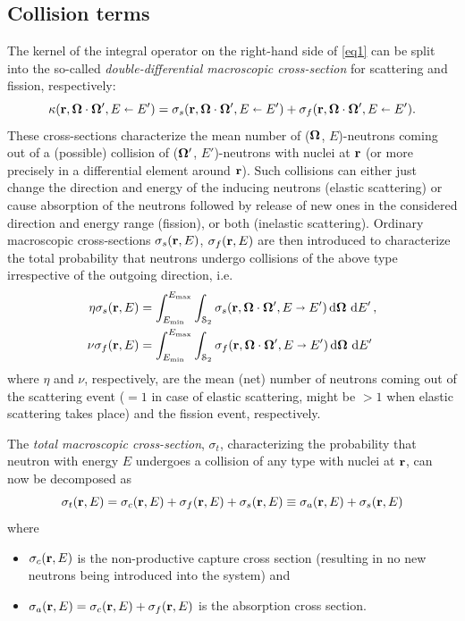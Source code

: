 \subsection{Collision terms}
The kernel of the integral operator on the right-hand side of \eqref{eq1} can be split into the so-called
\textit{double-differential macroscopic cross-section} for scattering and fission, respectively:
\begin{equation}\label{eq:splitting}
  \kappa(\br,\bomega\cdot\bomega',E\sla E') = \sigma_s(\br,\bomega\cdot\bomega',E\sla E') +
  \sigma_f(\br,\bomega\cdot\bomega',E\sla E').
\end{equation}
These cross-sections characterize the mean number of ($\bomega$, $E$)-neutrons coming out of a (possible) collision of 
($\bomega'$, $E'$)-neutrons with nuclei at $\br$ (or more precisely in a
differential element around $\br$). Such collisions can either just change the direction and energy of the
inducing neutrons (elastic scattering) or cause absorption of the neutrons followed by release of
new ones in the considered direction and energy range (fission), or both (inelastic scattering).
Ordinary macroscopic cross-sections $\sigma_s(\br,E)$, $\sigma_f(\br,E)$ are then introduced to characterize the total
probability that neutrons undergo collisions of the above type irrespective of the outgoing direction, i.e.
\begin{equation}\label{eq:ddifxs}
\begin{aligned}
\eta\sigma_s(\br, E) &= \intE[']{\Emin}{\Emax}{\intA{\sigma_s(\br,\bomega\cdot\bomega', 
	E\shortrightarrow E')}},\\
\nu\sigma_f(\br, E) &= \intE[']{\Emin}{\Emax}{\intA{\sigma_f(\br,\bomega\cdot\bomega', 
	E\shortrightarrow E')}}
\end{aligned}
\end{equation}
where $\eta$ and $\nu$, respectively, are the mean (net) number of neutrons coming out of the scattering event ($=1$ in
case of elastic scattering, might be $> 1$ when elastic scattering takes place) and the fission event, respectively. 

The \textit{total macroscopic cross-section}, $\sigma_t$, characterizing the probability that neutron with energy $E$
undergoes a collision of any type with nuclei at $\br$, can now be decomposed as 
\begin{equation}\label{eq:st}
  \sigma_t(\br,E) = \sigma_c(\br,E) + \sigma_f(\br,E) + \sigma_s(\br,E) \equiv \sigma_a(\br,E) + \sigma_s(\br,E)
\end{equation}
where
\begin{itemize}
	\item $\sigma_c(\br, E)$ is the non-productive capture cross section (resulting in no new neutrons being introduced
	into the system) and
  	\item $\sigma_a(\br, E) = \sigma_c(\br,E) + \sigma_f(\br,E)$ is the absorption cross section.
\end{itemize}


